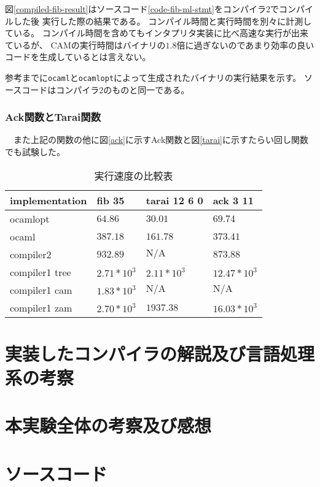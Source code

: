 \documentclass[report]{jlreq}
\begin{document}
      図\ref{compiled-fib-result}はソースコード\ref{code-fib-ml-stmt}をコンパイラ2でコンパイルした後
      実行した際の結果である。
      コンパイル時間と実行時間を別々に計測している。
      コンパイル時間を含めてもインタプリタ実装に比べ高速な実行が出来ているが、
      CAMの実行時間はバイナリの$1.8$倍に過ぎないのであまり効率の良いコードを生成しているとは言えない。
      
      

      参考までに\texttt{ocaml}と\texttt{ocamlopt}によって生成されたバイナリの実行結果を示す。
      ソースコードはコンパイラ2のものと同一である。
      
    \subsection{Ack関数とTarai関数}
    　また上記の関数の他に図\ref{ack}に示すAck関数と図\ref{tarai}に示すたらい回し関数でも試験した。
      
      
      \begin{table}[t]
        \centering
        \caption{実行速度の比較表}
        \begin{tabular}{l|lll}
        implementation & fib 35         & tarai 12 6 0                 & ack 3 11                      \\ \hline
        ocamlopt       & $64.86       $ & $ 30.01        $ & $ 69.74        $ \\
        ocaml          & $387.18      $ & $ 161.78       $ & $ 373.41       $ \\
        compiler2      & $932.89      $ & $ \mathrm{N/A} $ & $ 873.88       $ \\
        compiler1 tree & $2.71 * 10^3 $ & $ 2.11 * 10^3  $ & $ 12.47 * 10^3 $ \\
        compiler1 cam  & $1.83 * 10^3 $ & $ \mathrm{N/A} $ & $ \mathrm{N/A} $ \\
        compiler1 zam  & $2.70 * 10^3 $ & $ 1937.38      $ & $ 16.03 * 10^3 $
        \end{tabular}
      \end{table}
  \chapter{実装したコンパイラの解説及び言語処理系の考察}
  \chapter{本実験全体の考察及び感想}
  \chapter{ソースコード}
\end{document}
